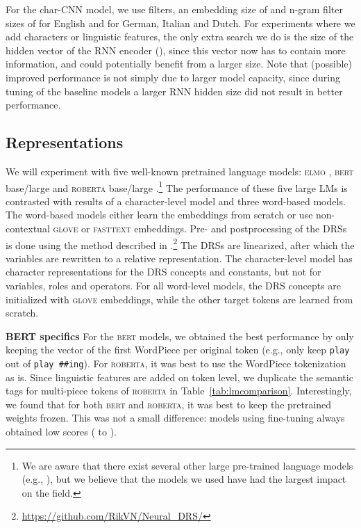 \documentclass[11pt,a4paper]{article}
\newcommand{\bert}{\textsc{bert}}
\newcommand{\roberta}{\textsc{roberta}}
\newcommand{\elmo}{\textsc{elmo}}
\newcommand{\glove}{\textsc{glove}}
\newcommand{\fasttext}{\textsc{fasttext}}
\newcommand{\inlineheader}[1]{\vspace{0.06cm}
\noindent\textbf{#1}\quad
}
\begin{document}
For the char-CNN model, we use  filters, an embedding size of  and n-gram filter sizes of  for English and  for German, Italian and Dutch. For experiments where we add characters or linguistic features, the only extra search we do is the size of the hidden vector of the RNN encoder (), since this vector now has to contain more information, and could potentially benefit from a larger size. Note that (possible) improved performance is not simply due to larger model capacity, since during tuning of the baseline models a larger RNN hidden size did not result in better performance.

\subsection{Representations}
\label{sec:lms}


We will experiment with five well-known pretrained language models: \elmo{} \citep{Peters:2018}, \bert{} base/large \citep{bert:19} and \roberta{} base/large \citep{roberta_arxiv:19}.\footnote{We are aware that there exist several other large pre-trained language models (e.g., \citealp{yang2019xlnet,2019t5,clark2020electra}), but we believe that the models we used have had the largest impact on the field.} The performance of these five large LMs is contrasted with results of a character-level model and three word-based models. The word-based models either learn the embeddings from scratch or use non-contextual \glove{} \citep{glove:14} or \fasttext{} \citep{grave2018learning} embeddings. 
Pre- and postprocessing of the DRSs is done using the method described in \citet{drstacl:18}.\footnote{\url{https://github.com/RikVN/Neural_DRS/}} The DRSs are linearized, after which the variables are rewritten to a relative representation. The character-level model has character representations for the DRS concepts and constants, but not for variables, roles and operators. For all word-level models, the DRS concepts are initialized with \glove{} embeddings, while the other target tokens are learned from scratch.

\inlineheader{BERT specifics} For the \bert{} models, we obtained the best performance by only keeping the vector of the first WordPiece per original token (e.g., only keep \texttt{play} out of \texttt{play \#\#ing}). For \roberta{}, it was best to use the WordPiece tokenization as is. Since linguistic features are added on token level, we duplicate the semantic tags for multi-piece tokens of \roberta{} in Table~\ref{tab:lmcomparison}. Interestingly, we found that for both \bert{} and \roberta{}, it was best to keep the pretrained weights frozen. This was not a small difference: models using fine-tuning always obtained low scores ( to ).
\end{document}
